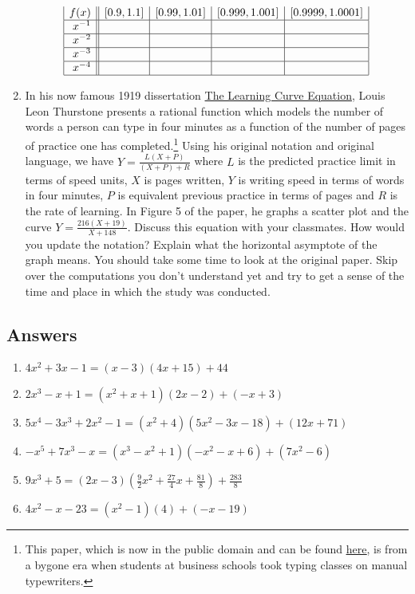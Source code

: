 \documentclass{ximera}
\begin{document}
\begin{enumerate}
\[\begin{array}{|r||c|c|c|c|}
 f(x) &  [0.9, 1.1] & [0.99, 1.01] &[0.999, 1.001] & [0.9999, 1.0001]  \\ \hline
 x^{-1} &&&&   \\  \hline
 x^{-2} &&&&    \\  \hline
 x^{-3} &&&&   \\  \hline
 x^{-4} &&&&   \\  \hline
\end{array} \]

\item {}  In his now famous 1919 dissertation \underline{The Learning Curve Equation}, Louis Leon Thurstone presents a rational function which models the number of words a person can type in four minutes as a function of the number of pages of practice one has completed.\footnote{This paper, which is now in the public domain and can be found  \href{http://bit.ly/2uNaUBa}{\underline{here}}, is from a bygone era when students at business schools took typing classes on manual typewriters.} Using his original notation and original language, we have $Y = \frac{L(X + P)}{(X + P) + R}$ where $L$ is the predicted practice limit in terms of speed units, $X$ is pages written, $Y$ is writing speed in terms of words in four minutes, $P$ is equivalent previous practice in terms of pages and $R$ is the rate of learning. In Figure 5 of the paper, he graphs a scatter plot and the curve $Y = \frac{216(X + 19)}{X + 148}$.  Discuss this equation with your classmates.  How would you update the notation?  Explain what the horizontal asymptote of the graph means.  You should take some time to look at the original paper. Skip over the computations you don't understand yet and try to get a sense of the time and place in which the study was conducted.

\end{enumerate}

\newpage

\subsection{Answers}

\begin{enumerate}
\item $4x^2+3x-1 = (x-3)(4x+15) + 44$
\item $2x^3-x+1 = \left(x^2+x+1\right)(2x-2)+(-x+3)$
\item $5x^{4} - 3x^{3} + 2x^{2} - 1 = \left(x^{2} + 4 \right) \left(5x^{2} - 3x - 18 \right) + (12x + 71)$
\item $-x^{5} + 7x^{3} - x = \left(x^{3} - x^{2} + 1 \right) \left(-x^{2} - x + 6 \right) + \left(7x^{2} - 6 \right)$
\item $9x^{3} + 5 =(2x - 3) \left(\frac{9}{2}x^{2} + \frac{27}{4}x + \frac{81}{8} \right) + \frac{283}{8}$
\item $4x^2 - x - 23 = \left(x^{2} - 1 \right)(4) + (-x - 19)$
\setcounter{HW}{\value{enumi}}
\end{enumerate}
\end{document}
